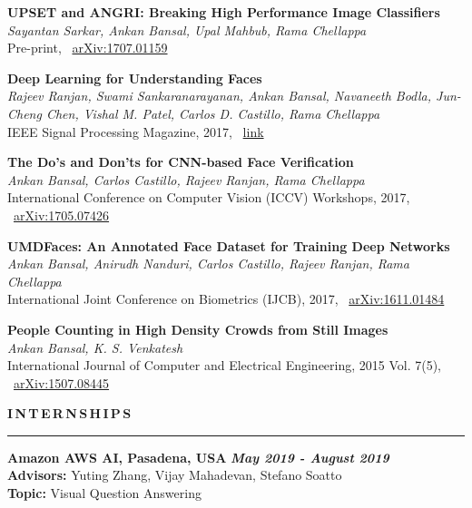 \documentclass[11pt, a4paper]{article}
\begin{document}
\vspace{3pt}

\textbf{UPSET and ANGRI: Breaking High Performance Image Classifiers} \\
\textit{Sayantan Sarkar, Ankan Bansal, Upal Mahbub, Rama Chellappa}\\
Pre-print, ~\href{https://arxiv.org/abs/1707.01159}{arXiv:1707.01159}

\vspace{3pt}

\textbf{Deep Learning for Understanding Faces} \\
\textit{Rajeev Ranjan, Swami Sankaranarayanan, Ankan Bansal, Navaneeth Bodla, Jun-Cheng Chen, Vishal
M. Patel,  Carlos D. Castillo, Rama Chellappa}\\
IEEE Signal Processing Magazine, 2017, ~\href{https://ieeexplore.ieee.org/abstract/document/8253595}{link}

\vspace{3pt}

\textbf{The Do's and Don'ts for CNN-based Face Verification} \\
\textit{Ankan Bansal, Carlos Castillo, Rajeev Ranjan, Rama Chellappa}\\
International Conference on Computer Vision (ICCV) Workshops, 2017, ~\href{https://arxiv.org/abs/1705.07426}{arXiv:1705.07426}

\vspace{3pt}

\textbf{UMDFaces: An Annotated Face Dataset for Training Deep Networks} \\
\textit{Ankan Bansal, Anirudh Nanduri, Carlos Castillo, Rajeev Ranjan, Rama Chellappa}\\
International Joint Conference on Biometrics (IJCB), 2017, ~\href{https://arxiv.org/abs/1611.01484}{arXiv:1611.01484}

\vspace{3pt}

\textbf{People Counting in High Density Crowds from Still Images} \\
\textit{Ankan Bansal, K. S. Venkatesh}\\
International Journal of Computer and Electrical Engineering, 2015 Vol. 7(5), ~\href{https://arxiv.org/abs/1507.08445}{arXiv:1507.08445}

\vspace{8pt}

\textbf{I\,N\,T\,E\,R\,N\,S\,H\,I\,P\,S}
\vspace{5pt}
\hrule
\vspace{7pt}
\textbf{Amazon AWS AI, Pasadena, USA} \hfill \textit{\textbf{May 2019 - August 2019}} \\
\textbf{Advisors: }Yuting Zhang, Vijay Mahadevan, Stefano Soatto \\
\textbf{Topic: }Visual Question Answering
\end{document}
